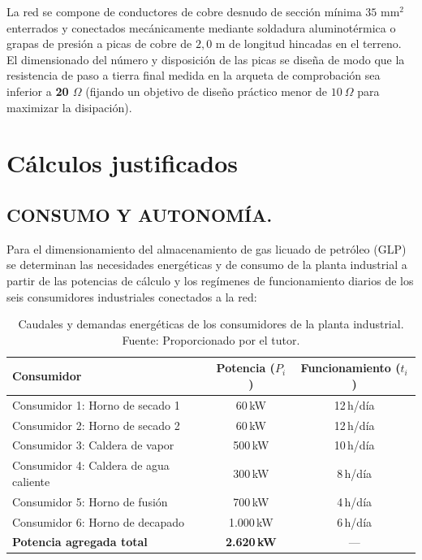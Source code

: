 \documentclass[12pt]{article}
\begin{document}
        La red se compone de conductores de cobre desnudo de sección mínima $35\text{ mm}^2$ enterrados y conectados mecánicamente mediante soldadura aluminotérmica o grapas de presión a picas de cobre de $2,0\text{ m}$ de longitud hincadas en el terreno. El dimensionado del número y disposición de las picas se diseña de modo que la resistencia de paso a tierra final medida en la arqueta de comprobación sea inferior a \textbf{20 $\Omega$} (fijando un objetivo de diseño práctico menor de $10\ \Omega$ para maximizar la disipación).

        \clearpage
        


    \section{Cálculos justificados}
    \label{Cálculos Justificados}


        \subsection{CONSUMO Y AUTONOMÍA.}
        \label{sub:consumo_autonomia}
        Para el dimensionamiento del almacenamiento de gas licuado de petróleo (GLP) se determinan las necesidades energéticas y de consumo de la planta industrial a partir de las potencias de cálculo y los regímenes de funcionamiento diarios de los seis consumidores industriales conectados a la red:
        
        \begin{table}[H]
            \centering
            \caption{Caudales y demandas energéticas de los consumidores de la planta industrial. Fuente: Proporcionado por el tutor.}
            \label{tab:demandas_consumidores}
            \setlength{\tabcolsep}{4pt}
            \begin{tabularx}{\textwidth}{Xcc}
                \toprule
                \textbf{Consumidor} & \textbf{Potencia ($P_i$)} & \textbf{Funcionamiento ($t_i$)} \\
                \midrule
                Consumidor 1: Horno de secado 1 & 60\,kW & 12\,h/día \\
                Consumidor 2: Horno de secado 2 & 60\,kW & 12\,h/día \\
                Consumidor 3: Caldera de vapor & 500\,kW & 10\,h/día \\
                Consumidor 4: Caldera de agua caliente & 300\,kW & 8\,h/día \\
                Consumidor 5: Horno de fusión & 700\,kW & 4\,h/día \\
                Consumidor 6: Horno de decapado & 1.000\,kW & 6\,h/día \\
                \midrule
                \textbf{Potencia agregada total} & \textbf{2.620\,kW} & — \\
                \bottomrule
            \end{tabularx}
            \small
        \end{table}
\end{document}
